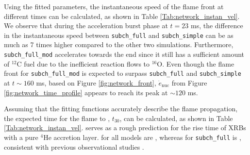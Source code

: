 \documentclass[preprint,times,tighten,linenumbers,trackchanges]{aastex631}
\begin{document}
Using the fitted parameters, the instantaneous speed of the flame front at different times can be calculated, as shown in Table \ref{Tab:network_instan_vel}. We observe that during the acceleration burst phase at $t = 23$ ms, the difference in the instantaneous speed between {\tt subch\_full} and {\tt subch\_simple} can be as much as 7 times higher compared to the other two simulations. Furthermore, {\tt subch\_full\_mod} accelerates towards the end since it still has a sufficient amount of ${}^{12}$C fuel due to the inefficient reaction flows to ${}^{16}$O. Even though the flame front for {\tt subch\_full\_mod} is expected to surpass {\tt subch\_full} and {\tt subch\_simple} at $t \sim 160$ ms, based on Figure \ref{fig:network_front}, $\dot{e}_{\textrm{nuc}}$ from Figure \ref{fig:network_time_profile} appears to reach its peak at $\sim 120$ ms.  

Assuming that the fitting functions accurately describe the flame propagation, the expected time for the flame to , $t_{30}$, can be calculated, as shown in Table \ref{Tab:network_instan_vel}.    serves as a rough prediction for the rise time of XRBs with a pure ${}^{4}$He accretion layer.  for all models are , whereas  for {\tt subch\_full} is , consistent with previous observational studies \citep{galloway:2008}.  
\end{document}
